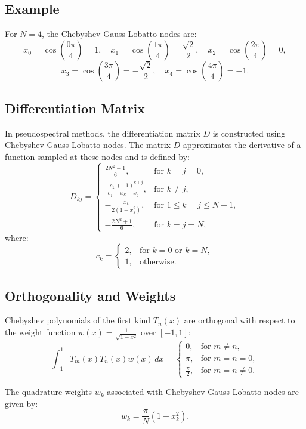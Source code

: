 \documentclass[12pt]{report} %
\begin{document}
\subsection{Example}
For \( N = 4 \), the Chebyshev-Gauss-Lobatto nodes are:
\[
x_0 = \cos\left(\frac{0 \pi}{4}\right) = 1, \quad x_1 = \cos\left(\frac{1 \pi}{4}\right) = \frac{\sqrt{2}}{2}, \quad x_2 = \cos\left(\frac{2 \pi}{4}\right) = 0,
\]
\[
x_3 = \cos\left(\frac{3 \pi}{4}\right) = -\frac{\sqrt{2}}{2}, \quad x_4 = \cos\left(\frac{4 \pi}{4}\right) = -1.
\]

\subsection{Differentiation Matrix}
In pseudospectral methods, the differentiation matrix \( D \) is constructed using Chebyshev-Gauss-Lobatto nodes. The matrix \( D \) approximates the derivative of a function sampled at these nodes and is defined by:
\[
D_{kj} = \begin{cases}
    \frac{2N^2 + 1}{6}, & \text{for } k = j = 0, \\
    \frac{-c_k}{c_j} \frac{(-1)^{k+j}}{x_k - x_j}, & \text{for } k \neq j, \\
    -\frac{x_k}{2(1 - x_k^2)}, & \text{for } 1 \leq k = j \leq N-1, \\
    -\frac{2N^2 + 1}{6}, & \text{for } k = j = N,
\end{cases}
\]
where:
\[
c_k = \begin{cases}
    2, & \text{for } k = 0 \text{ or } k = N, \\
    1, & \text{otherwise}.
\end{cases}
\]

\subsection{Orthogonality and Weights}
Chebyshev polynomials of the first kind \( T_n(x) \) are orthogonal with respect to the weight function \( w(x) = \frac{1}{\sqrt{1 - x^2}} \) over \( [-1, 1] \):
\[
\int_{-1}^{1} T_m(x) T_n(x) w(x) \, dx = \begin{cases}
    0, & \text{for } m \neq n, \\
    \pi, & \text{for } m = n = 0, \\
    \frac{\pi}{2}, & \text{for } m = n \neq 0.
\end{cases}
\]

The quadrature weights \( w_k \) associated with Chebyshev-Gauss-Lobatto nodes are given by:
\[
w_k = \frac{\pi}{N} \left(1 - x_k^2\right).
\]
\end{document}
